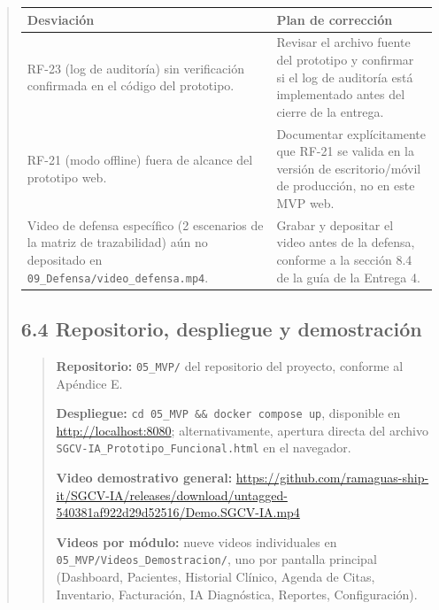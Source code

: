 \documentclass[
]{article}
\newcounter{none} %
\begin{document}
\begin{quote}
{\def\LTcaptype{none} %
\begin{longtable}[]{|
  >{\raggedright\arraybackslash}p{}|
  >{\raggedright\arraybackslash}p{}|}
\hline
\begin{minipage}[b]{\linewidth}\raggedright
\textbf{Desviación}
\end{minipage} & \begin{minipage}[b]{\linewidth}\raggedright
\textbf{Plan de corrección}
\end{minipage} \\
\hline
\endhead
\hline
\endlastfoot
RF-23 (log de auditoría) sin verificación confirmada en el código del prototipo. & Revisar el archivo fuente del prototipo y confirmar si el log de auditoría está implementado antes del cierre de la entrega. \\
\hline
RF-21 (modo offline) fuera de alcance del prototipo web. & Documentar explícitamente que RF-21 se valida en la versión de escritorio/móvil de producción, no en este MVP web. \\
\hline
Video de defensa específico (2 escenarios de la matriz de trazabilidad) aún no depositado en \texttt{09\_Defensa/video\_defensa.mp4}. & Grabar y depositar el video antes de la defensa, conforme a la sección 8.4 de la guía de la Entrega 4. \\
\hline
\end{longtable}
}

\subsection{6.4 Repositorio, despliegue y
demostración}\label{s6-4-repositorio-despliegue-demostracion}

\begin{quote}
\textbf{Repositorio:} \texttt{05\_MVP/} del repositorio del proyecto,
conforme al Apéndice E.

\textbf{Despliegue:} \verb|cd 05_MVP && docker compose up|, disponible
en \url{http://localhost:8080}; alternativamente, apertura directa del
archivo \texttt{SGCV-IA\_Prototipo\_Funcional.html} en el navegador.

\textbf{Video demostrativo general:}
\url{https://github.com/ramaguas-ship-it/SGCV-IA/releases/download/untagged-540381af922d29d52516/Demo.SGCV-IA.mp4}

\textbf{Videos por módulo:} nueve videos individuales en
\texttt{05\_MVP/Videos\_Demostracion/}, uno por pantalla principal
(Dashboard, Pacientes, Historial Clínico, Agenda de Citas, Inventario,
Facturación, IA Diagnóstica, Reportes, Configuración).
\end{quote}

\end{quote}
\end{document}
